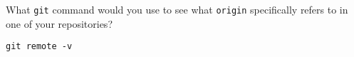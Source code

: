 \documentclass[10pt]{examdesign}
\begin{document}
\begin{shortanswer}[title={Short Answer},
                    rearrange=no,resetcounter=no]
\begin{block}[questions=3]
\begin{question}
  What \texttt{git} command would you use to see what \texttt{origin}
  specifically refers to in one of your repositories?
  \vspace{5mm}
  \begin{answer}
    \texttt{git remote -v}
  \end{answer}
\end{question}

\end{block}

\end{shortanswer}
\end{document}
